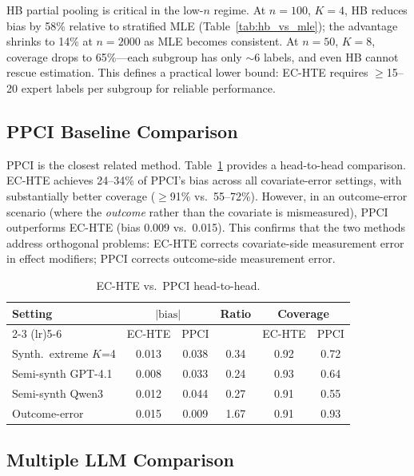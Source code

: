 \documentclass[11pt,a4paper]{article}
\begin{document}
HB partial pooling is critical in the low-$n$ regime.
At $n = 100$, $K = 4$, HB reduces bias by 58\% relative to stratified MLE (Table~\ref{tab:hb_vs_mle}); the advantage shrinks to 14\% at $n = 2000$ as MLE becomes consistent.
At $n = 50$, $K = 8$, coverage drops to 65\%---each subgroup has only $\sim$6 labels, and even HB cannot rescue estimation.
This defines a practical lower bound: EC-HTE requires $\geq$15--20 expert labels per subgroup for reliable performance.

\subsection{PPCI Baseline Comparison}
\label{sec:ppci}

PPCI \citep{sui2026ppci} is the closest related method.
Table~\ref{tab:ppci} provides a head-to-head comparison.
EC-HTE achieves 24--34\% of PPCI's bias across all covariate-error settings, with substantially better coverage ($\geq$91\% vs.\ 55--72\%).
However, in an outcome-error scenario (where the \emph{outcome} rather than the covariate is mismeasured), PPCI outperforms EC-HTE (bias 0.009 vs.\ 0.015).
This confirms that the two methods address orthogonal problems: EC-HTE corrects covariate-side measurement error in effect modifiers; PPCI corrects outcome-side measurement error.

\begin{table}[t]
\centering
\small
\caption{EC-HTE vs.\ PPCI head-to-head.}
\label{tab:ppci}
\begin{tabular}{l cc c cc}
\toprule
Setting & \multicolumn{2}{c}{$|\text{bias}|$} & Ratio & \multicolumn{2}{c}{Coverage} \\
\cmidrule(lr){2-3} \cmidrule(lr){5-6}
 & EC-HTE & PPCI & & EC-HTE & PPCI \\
\midrule
Synth.\ extreme $K$=4    & 0.013 & 0.038 & 0.34 & 0.92 & 0.72 \\
Semi-synth GPT-4.1       & 0.008 & 0.033 & 0.24 & 0.93 & 0.64 \\
Semi-synth Qwen3         & 0.012 & 0.044 & 0.27 & 0.91 & 0.55 \\
Outcome-error            & 0.015 & 0.009 & 1.67 & 0.91 & 0.93 \\
\bottomrule
\end{tabular}
\end{table}

\subsection{Multiple LLM Comparison}
\label{sec:multi_llm}
\end{document}
